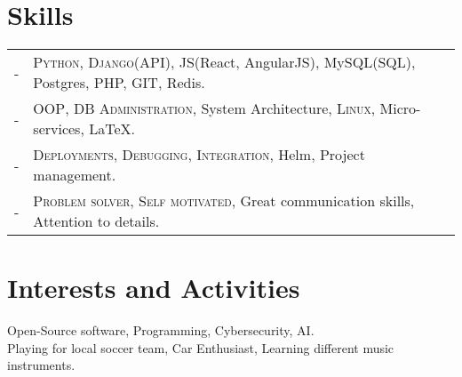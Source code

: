 \documentclass[a4paper,10pt]{article} %
\begin{document}
\section{Skills}

\begin{tabular}{rl}
- & \textsc{Python, Django(API)}, JS(React, AngularJS), MySQL(SQL), Postgres, PHP, GIT, Redis.\\

- & \textsc{OOP}, \textsc{DB Administration}, System Architecture, \textsc{Linux}, Micro-services, {\sffamily\LaTeX}.\setmainfont[SmallCapsFont=Fontin SmallCaps]{Fontin-Regular}\\

- & \textsc{Deployments, Debugging, Integration}, Helm, Project management.\\

- & \textsc{Problem solver, Self motivated}, Great communication skills, Attention to details.\\
\end{tabular}


\section{Interests and Activities}

Open-Source software, Programming, Cybersecurity, AI.\\
Playing for local soccer team, Car Enthusiast, Learning different music instruments.




\end{document}
